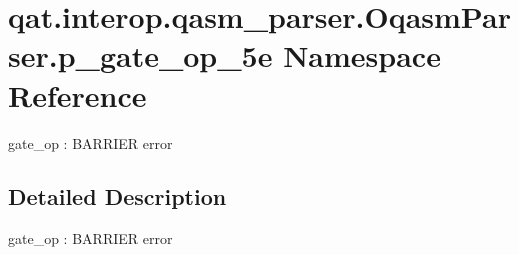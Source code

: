 \hypertarget{namespaceqat_1_1interop_1_1qasm__parser_1_1OqasmParser_1_1p__gate__op__5e}{\section{qat.\-interop.\-qasm\-\_\-parser.\-Oqasm\-Parser.\-p\-\_\-gate\-\_\-op\-\_\-5e Namespace Reference}
\label{namespaceqat_1_1interop_1_1qasm__parser_1_1OqasmParser_1_1p__gate__op__5e}
}


gate\-\_\-op \-: B\-A\-R\-R\-I\-E\-R error  




\subsection{Detailed Description}
gate\-\_\-op \-: B\-A\-R\-R\-I\-E\-R error 